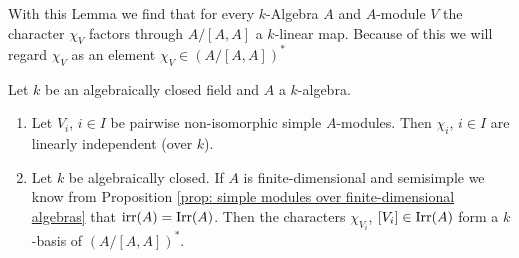 With this Lemma we find that for every $k$-Algebra $A$ and $A$-module $V$ the character $\chi_V$ factors through $A/[A,A]$ a $k$-linear map. Because of this we will regard $\chi_V$ as an element $\chi_V \in (A/[A,A])^*$


\begin{thrm}
 Let $k$ be an algebraically closed field and $A$ a $k$-algebra.
 \begin{enumerate}[label=\emph{\alph*)},leftmargin=*]
  \item
   Let $V_i$, $i \in I$ be pairwise non-isomorphic simple $A$-modules. Then $\chi_i$, $i \in I$ are linearly independent (over $k$).
  \item
   Let $k$ be algebraically closed. If $A$ is finite-dimensional and semisimple we know from Proposition \ref{prop: simple modules over finite-dimensional algebras} that $\operatorname{irr}(A) = \operatorname{Irr}(A)$. Then the characters $\chi_{V_i}$, $[V_i] \in \operatorname{Irr}(A)$ form a $k$-basis of $(A/[A,A])^*$.
 \end{enumerate}
\end{thrm}
